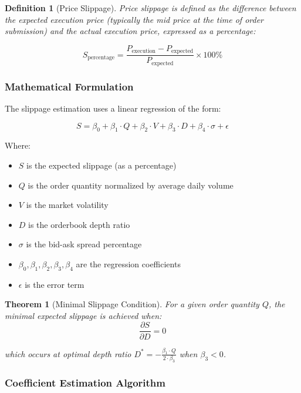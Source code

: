 \documentclass[10pt,twocolumn,a4paper]{IEEEtran}
\newtheorem{theorem}{Theorem}
\newtheorem{definition}{Definition}
\begin{document}
\begin{definition}[Price Slippage]
Price slippage is defined as the difference between the expected execution price (typically the mid price at the time of order submission) and the actual execution price, expressed as a percentage:

\begin{equation}
S_{\text{percentage}} = \frac{P_{\text{execution}} - P_{\text{expected}}}{P_{\text{expected}}} \times 100\%
\end{equation}
\end{definition}

\subsubsection{Mathematical Formulation}
The slippage estimation uses a linear regression of the form:

\begin{equation}
S = \beta_0 + \beta_1 \cdot Q + \beta_2 \cdot V + \beta_3 \cdot D + \beta_4 \cdot \sigma + \epsilon
\end{equation}

Where:
\begin{itemize}
    \item $S$ is the expected slippage (as a percentage)
    \item $Q$ is the order quantity normalized by average daily volume
    \item $V$ is the market volatility
    \item $D$ is the orderbook depth ratio
    \item $\sigma$ is the bid-ask spread percentage
    \item $\beta_0, \beta_1, \beta_2, \beta_3, \beta_4$ are the regression coefficients
    \item $\epsilon$ is the error term
\end{itemize}

\begin{theorem}[Minimal Slippage Condition]
For a given order quantity $Q$, the minimal expected slippage is achieved when:
\begin{equation}
\frac{\partial S}{\partial D} = 0
\end{equation}

which occurs at optimal depth ratio $D^* = - \frac{\beta_1 \cdot Q}{2 \cdot \beta_3}$ when $\beta_3 < 0$.
\end{theorem}

\subsubsection{Coefficient Estimation Algorithm}
\end{document}
